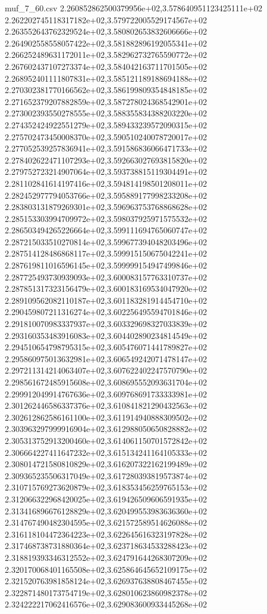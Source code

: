 \begin{filecontents*}{muf_7_60.csv}
2.260852862500379956e+02,3.578640951123425111e+02
2.262202745118317182e+02,3.579722005529174567e+02
2.263552643762329524e+02,3.580802653832606666e+02
2.264902558558057422e+02,3.581882896192055341e+02
2.266252489631172011e+02,3.582962732765590772e+02
2.267602437107273374e+02,3.584042163711701505e+02
2.268952401111807831e+02,3.585121189188694188e+02
2.270302381770166562e+02,3.586199809354848185e+02
2.271652379207882859e+02,3.587278024368542901e+02
2.273002393550278555e+02,3.588355834388203220e+02
2.274352424922551279e+02,3.589433239572090315e+02
2.275702473450008370e+02,3.590510240078720017e+02
2.277052539257836941e+02,3.591586836066471733e+02
2.278402622471107293e+02,3.592663027693815820e+02
2.279752723214907064e+02,3.593738815119304491e+02
2.281102841614197416e+02,3.594814198501208011e+02
2.282452977794053766e+02,3.595889177998233208e+02
2.283803131879269301e+02,3.596963753768868628e+02
2.285153303994709972e+02,3.598037925971575532e+02
2.286503494265226664e+02,3.599111694765060747e+02
2.287215033510270814e+02,3.599677394048203496e+02
2.287514128486868117e+02,3.599915150675042241e+02
2.287619811016596145e+02,3.599999154947499846e+02
2.287725493730939093e+02,3.600083157763310737e+02
2.287851317323156479e+02,3.600183169534047920e+02
2.289109562082110187e+02,3.601183281914454710e+02
2.290459807211316274e+02,3.602256495594701846e+02
2.291810070983337937e+02,3.603329698327033839e+02
2.293160353483916083e+02,3.604402890234814549e+02
2.294510654798795315e+02,3.605476071441789827e+02
2.295860975013632981e+02,3.606549242071478147e+02
2.297211314214063407e+02,3.607622402247570790e+02
2.298561672485915608e+02,3.608695552093631704e+02
2.299912049914767636e+02,3.609768691733333981e+02
2.301262446586337376e+02,3.610841821290432563e+02
2.302612862586161100e+02,3.611914940888309502e+02
2.303963297999916904e+02,3.612988050650828882e+02
2.305313752913200460e+02,3.614061150701572842e+02
2.306664227411647232e+02,3.615134241164105333e+02
2.308014721580810829e+02,3.616207322162199489e+02
2.309365235506317049e+02,3.617280393819573874e+02
2.310715769273620879e+02,3.618353456259765153e+02
2.312066322968420025e+02,3.619426509606591935e+02
2.313416896676128829e+02,3.620499553983636360e+02
2.314767490482304595e+02,3.621572589514626088e+02
2.316118104472364223e+02,3.622645616323197828e+02
2.317468738731880364e+02,3.623718634533288423e+02
2.318819393346312552e+02,3.624791644268307209e+02
2.320170068401165508e+02,3.625864645652109175e+02
2.321520763981858124e+02,3.626937638808467455e+02
2.322871480173754719e+02,3.628010623860982378e+02
2.324222217062416576e+02,3.629083600933445268e+02

\end{filecontents*}
